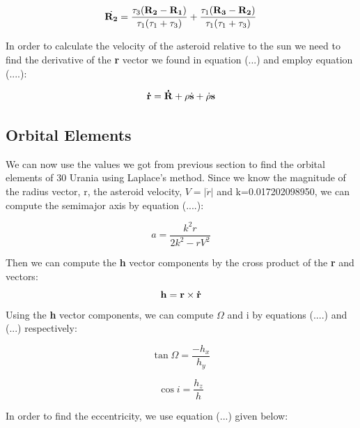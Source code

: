\documentclass[letterpaper,12pt]{article}
\begin{document}
\begin{equation}
\dot{{\bf R_{2}}}=\frac{\tau_{3}({\bf R_{2}}-{\bf R_{1}})}{\tau_{1}(\tau_{1}+\tau_{3})}+\frac{\tau_{1}({\bf R_{3}}-{\bf R_{2}})}{\tau_{1}(\tau_{1}+\tau_{3})}
\end{equation}

In order to calculate the velocity of the asteroid relative to the sun we need to find the derivative of the {\bf r} vector we found in equation (...) and employ equation (....):

\begin{equation}
{\bf \dot{r}}={\bf \dot{R}} +\rho{\dot{\bf s}} + \dot{\rho} {\bf s}
\end{equation}

\subsection{Orbital Elements}
We can now use the values we got from previous section to find the orbital elements of 30 Urania using Laplace's method. Since we know the magnitude of the radius vector, r, the asteroid velocity, \begin{math}V=|\dot{r}| \end{math} and k=0.017202098950, we can compute the semimajor axis by equation (....):

\begin{equation}
a=\frac{k^2r}{2k^2-rV^2}
\end{equation}

Then we can compute the {\bf h} vector components by the cross product of the {\bf r} and {\bf {}} vectors:
\begin{equation}
{\bf h}= {\bf r} \times {\bf \dot{r}}
\end{equation}
Using the {\bf h} vector components, we can compute \begin{math} \Omega \end{math} and i by equations (....) and (...) respectively:

\begin{equation}
\tan \Omega = \frac{-h_{x}}{h_{y}}
\end{equation}

\begin{equation}
\cos i = \frac{h_{z}}{h}
\end{equation}

In order to find the eccentricity, we use equation (...) given below:
\end{document}
